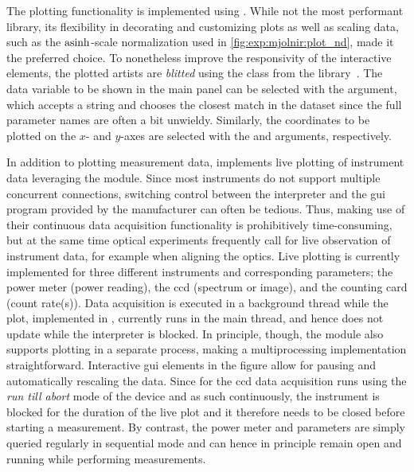 The plotting functionality is implemented using \matplotlib.
While not the most performant library, its flexibility in decorating and customizing plots as well as scaling data, such as the $\operatorname{asinh}$-scale normalization used in \cref{fig:exp:mjolnir:plot_nd}, made it the preferred choice.
To nonetheless improve the responsivity of the interactive elements, the plotted artists are \emph{blitted}
using the  class from the \qutil library~\cite{Hangleiter_qutil}.
The data variable to be shown in the main panel can be selected with the  argument, which accepts a string and chooses the closest match in the dataset since the full parameter names are often a bit unwieldy.
Similarly, the coordinates to be plotted on the $x$- and $y$-axes are selected with the  and  arguments, respectively.

In addition to plotting measurement data, \mjolnir implements live plotting of instrument data leveraging the  module.
Since most instruments do not support multiple concurrent connections, switching control between the \python interpreter and the \gls{gui} program provided by the manufacturer can often be tedious.
Thus, making use of their continuous data acquisition functionality is prohibitively time-consuming, but at the same time optical experiments frequently call for live observation of instrument data, for example when aligning the optics.
Live plotting is currently implemented for three different instruments and corresponding parameters; the \thorlabspowermeter power meter (power reading), the \theccd \gls{ccd} (spectrum or image), and the \tagger counting card (count rate(s)).
Data acquisition is executed in a background thread while the plot, implemented in \matplotlib, currently runs in the main thread, and hence does not update while the interpreter is blocked.
In principle, though, the  module also supports plotting in a separate process, making a multiprocessing implementation straightforward.
Interactive \gls{gui} elements in the \matplotlib figure allow for pausing and automatically rescaling the data.
Since for the \gls{ccd} data acquisition runs using the \emph{run till abort} mode of the device and as such continuously, the instrument is blocked for the duration of the live plot and it therefore needs to be closed before starting a measurement.
By contrast, the power meter and \taggershort parameters are simply queried regularly in sequential mode and can hence in principle remain open and running while performing measurements.

